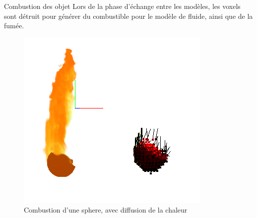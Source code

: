 \documentclass{beamer}
\begin{document}
\begin{frame}{Combustion des objet}
  Lors de la phase d'échange entre les modèles, les voxels sont
  détruit pour générer du combustible pour le modèle de fluide, ainsi
  que de la fumée.\\
  \begin{figure}[!h]
    \centering\includegraphics[scale=0.3]{Decomposition.png}
    \caption{Combustion d'une sphere, avec diffusion de la chaleur}
    \label{BoisQuiBrule}
  \end{figure}
\end{frame}
\end{document}
